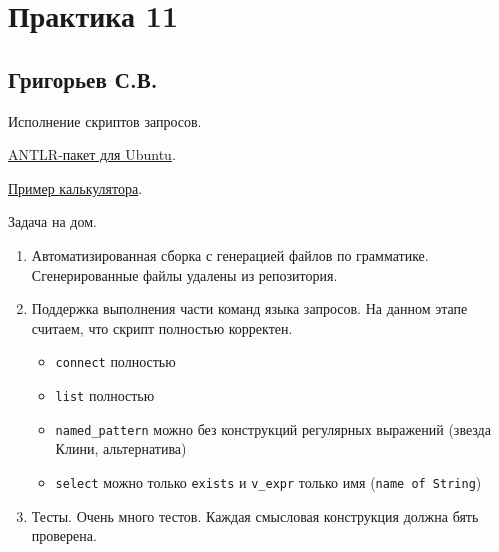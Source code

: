 \section{Практика 11}

\subsection{Григорьев С.В.}


Исполнение скриптов запросов.

\href{https://packages.ubuntu.com/search?keywords=antlr4}{ANTLR-пакет для Ubuntu}.

\href{https://github.com/shmatov/antlr4-calculator}{Пример калькулятора}.


Задача на дом.
\begin{enumerate}
  \item Автоматизированная сборка с генерацией файлов по грамматике. Сгенерированные файлы удалены из репозитория. 
  \item Поддержка выполнения части команд языка запросов. На данном этапе считаем, что скрипт полностью корректен.
  \begin{itemize}
    \item \verb|connect| полностью
    \item \verb|list| полностью
    \item \verb|named_pattern| можно без конструкций регулярных выражений (звезда Клини, альтернатива)
    \item \verb|select| можно только \verb|exists| и \verb|v_expr| только имя (\verb|name of String|)
  \end{itemize}
  \item Тесты. Очень много тестов. Каждая смысловая конструкция должна бять проверена. 

\end{enumerate}